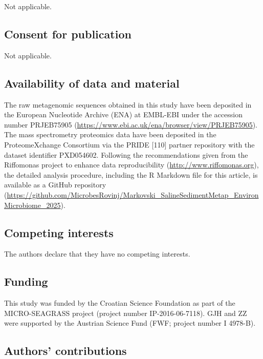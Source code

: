 \documentclass[
  12 pt,
]{article}
\begin{document}
\noindent
Not applicable.

\hypertarget{consent-for-publication}{%
\subsection{Consent for publication}\label{consent-for-publication}}

\noindent
Not applicable.

\hypertarget{availability-of-data-and-material}{%
\subsection{Availability of data and material}\label{availability-of-data-and-material}}

The raw metagenomic sequences obtained in this study have been deposited in the European Nucleotide Archive (ENA) at EMBL-EBI under the accession number PRJEB75905 (\url{https://www.ebi.ac.uk/ena/browser/view/PRJEB75905}). The mass spectrometry proteomics data have been deposited in the ProteomeXchange Consortium via the PRIDE {[}110{]} partner repository with the dataset identifier PXD054602. Following the recommendations given from the Riffomonas project to enhance data reproducibility (\url{http://www.riffomonas.org}), the detailed analysis procedure, including the R Markdown file for this article, is available as a GitHub repository (\url{https://github.com/MicrobesRovinj/Markovski_SalineSedimentMetap_EnvironMicrobiome_2025}).

\hypertarget{competing-interests}{%
\subsection{Competing interests}\label{competing-interests}}

\noindent
The authors declare that they have no competing interests.

\hypertarget{funding}{%
\subsection{Funding}\label{funding}}

This study was funded by the Croatian Science Foundation as part of the MICRO-SEAGRASS project (project number IP-2016-06-7118). GJH and ZZ were supported by the Austrian Science Fund (FWF; project number I 4978-B).

\hypertarget{authors-contributions}{%
\subsection{Authors' contributions}\label{authors-contributions}}
\end{document}
